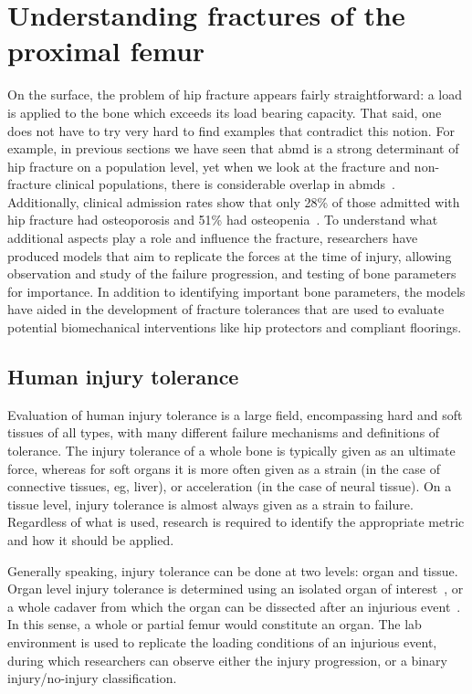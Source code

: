 \section{Understanding fractures of the proximal femur}
\label{sec:intro_understanding}
On the surface, the problem of hip fracture appears fairly straightforward: a load is applied to the bone which exceeds its load bearing capacity.
That said, one does not have to try very hard to find examples that contradict this notion.
For example, in previous sections we have seen that \ac{abmd} is a strong determinant of hip fracture on a population level, yet when we look at the fracture and non-fracture clinical populations, there is considerable overlap in \acp{abmd}~\citep{faulkner_simple_1993, greenspan_fall_1994}.
Additionally, clinical admission rates show that only 28\% of those admitted with hip fracture had osteoporosis and 51\% had osteopenia~\citep{stone_bmd_2003}.
To understand what additional aspects play a role and influence the fracture, researchers have produced models that aim to replicate the forces at the time of injury, allowing observation and study of the failure progression, and testing of bone parameters for importance.
In addition to identifying important bone parameters, the models have aided in the development of fracture tolerances that are used to evaluate potential biomechanical interventions like hip protectors and compliant floorings.

\subsection{Human injury tolerance}
\label{sec:intro_understanding_tolerance}
Evaluation of human injury tolerance is a large field, encompassing hard and soft tissues of all types, with many different failure mechanisms and definitions of tolerance.
The injury tolerance of a whole bone is typically given as an ultimate force, whereas for soft organs it is more often given as a strain (in the case of connective tissues, \ac{eg}, liver), or acceleration (in the case of neural tissue).
On a tissue level, injury tolerance is almost always given as a strain to failure.
Regardless of what is used, research is required to identify the appropriate metric and how it should be applied.

Generally speaking, injury tolerance can be done at two levels: organ and tissue.
Organ level injury tolerance is determined using an isolated organ of interest~\citep{courtney_age-related_1996}, or a whole cadaver from which the organ can be dissected after an injurious event~\citep{cavanaugh_biomechanical_1990}.
In this sense, a whole or partial femur would constitute an organ.
The lab environment is used to replicate the loading conditions of an injurious event, during which researchers can observe either the injury progression, or a binary injury/no-injury classification.

